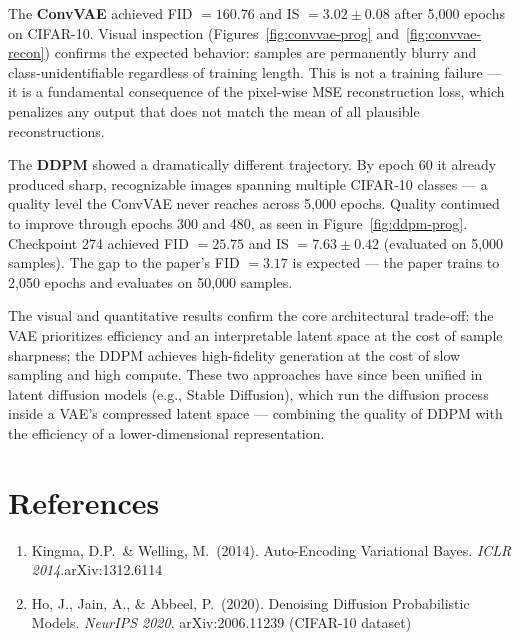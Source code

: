 \documentclass{article}
\begin{document}
The \textbf{ConvVAE} achieved FID $= 160.76$ and IS $= 3.02 \pm 0.08$ after 5,000 epochs on CIFAR-10. Visual inspection (Figures~\ref{fig:convvae-prog} and~\ref{fig:convvae-recon}) confirms the expected behavior: samples are permanently blurry and class-unidentifiable regardless of training length. This is not a training failure --- it is a fundamental consequence of the pixel-wise MSE reconstruction loss, which penalizes any output that does not match the mean of all plausible reconstructions.

The \textbf{DDPM} showed a dramatically different trajectory. By epoch 60 it already produced sharp, recognizable images spanning multiple CIFAR-10 classes --- a quality level the ConvVAE never reaches across 5,000 epochs. Quality continued to improve through epochs 300 and 480, as seen in Figure~\ref{fig:ddpm-prog}. Checkpoint 274 achieved FID $= 25.75$ and IS $= 7.63 \pm 0.42$ (evaluated on 5,000 samples). The gap to the paper's FID $= 3.17$ is expected --- the paper trains to 2,050 epochs and evaluates on 50,000 samples.

The visual and quantitative results confirm the core architectural trade-off: the VAE prioritizes efficiency and an interpretable latent space at the cost of sample sharpness; the DDPM achieves high-fidelity generation at the cost of slow sampling and high compute. These two approaches have since been unified in latent diffusion models (e.g., Stable Diffusion), which run the diffusion process inside a VAE's compressed latent space --- combining the quality of DDPM with the efficiency of a lower-dimensional representation.

\section*{References}

\begin{enumerate}
    \item Kingma, D.P.\ \& Welling, M.\ (2014). Auto-Encoding Variational Bayes. \textit{ICLR 2014}.\newline arXiv:1312.6114
    \item Ho, J., Jain, A., \& Abbeel, P.\ (2020). Denoising Diffusion Probabilistic Models. \textit{NeurIPS 2020}. arXiv:2006.11239
    (CIFAR-10 dataset)
\end{enumerate}
\end{document}
